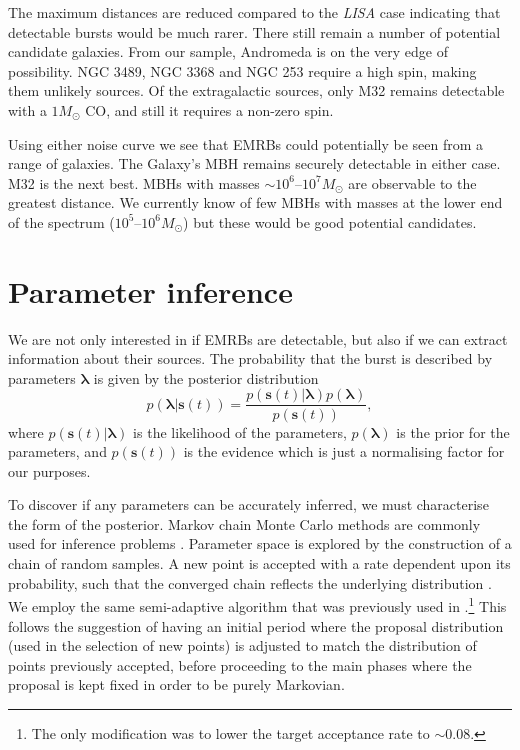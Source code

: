 \documentclass[useAMS,usedcolumn,usegraphicx,usenatbib]{mn2e}
\begin{document}
The maximum distances are reduced compared to the \textit{LISA} case indicating that detectable bursts would be much rarer. There still remain a number of potential candidate galaxies. From our sample, Andromeda is on the very edge of possibility. NGC 3489, NGC 3368 and NGC 253 require a high spin, making them unlikely sources. Of the extragalactic sources, only M32 remains detectable with a $1 M_\odot$ CO, and still it requires a non-zero spin.

Using either noise curve we see that EMRBs could potentially be seen from a range of galaxies. The Galaxy's MBH remains securely detectable in either case. M32 is the next best. MBHs with masses $\sim 10^6$--$10^7 M_\odot$ are observable to the greatest distance. We currently know of few MBHs with masses at the lower end of the spectrum ($10^5$--$10^6 M_\odot$) but these would be good potential candidates.

\section{Parameter inference}\label{sec:MCMC}

We are not only interested in if EMRBs are detectable, but also if we can extract information about their sources. The probability that the burst is described by parameters $\boldsymbol{\lambda}$ is given by the posterior distribution
\begin{equation}
p(\boldsymbol{\lambda}|\boldsymbol{s}(t)) = \frac{p(\boldsymbol{s}(t)|\boldsymbol{\lambda})p(\boldsymbol{\lambda})}{p(\boldsymbol{s}(t))},
\end{equation}
where $p(\boldsymbol{s}(t)|\boldsymbol{\lambda})$ is the likelihood of the parameters, $p(\boldsymbol{\lambda})$ is the prior for the parameters, and $p(\boldsymbol{s}(t))$ is the evidence which is just a normalising factor for our purposes.

To discover if any parameters can be accurately inferred, we must characterise the form of the posterior. Markov chain Monte Carlo methods are commonly used for inference problems \citep[chapter 29]{MacKay2003}. Parameter space is explored by the construction of a chain of random samples. A new point is accepted with a rate dependent upon its probability, such that the converged chain reflects the underlying distribution \citep{Metropolis1953,Hastings1970}. We employ the same semi-adaptive algorithm that was previously used in \citet{Berry2013}.\footnote{The only modification was to lower the target acceptance rate to $\sim0.08$.} This follows the suggestion of \citet{Haario1999} having an initial period where the proposal distribution (used in the selection of new points) is adjusted to match the distribution of points previously accepted, before proceeding to the main phases where the proposal is kept fixed in order to be purely Markovian.
\end{document}
